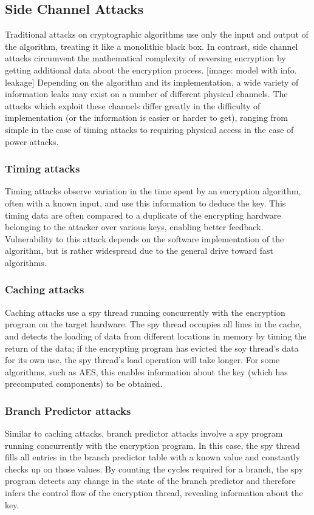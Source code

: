 \documentclass[times, 10pt,twocolumn]{article}
\begin{document}
\subsection{Side Channel Attacks}
Traditional attacks on cryptographic algorithms use only the input and output of the algorithm, treating it like a monolithic black box.  In contrast, side channel attacks circumvent the mathematical complexity of reversing encryption by getting additional data about the encryption process.  [image: model with info. leakage]  Depending on the algorithm and its implementation, a wide variety of information leaks may exist on a number of different physical channels.  The attacks which exploit these channels differ greatly in the difficulty of implementation (or the information is easier or harder to get), ranging from simple in the case of timing attacks to requiring physical access in the case of power attacks.
\subsubsection{Timing attacks}
Timing attacks observe variation in the time spent by an encryption algorithm, often with a known input, and use this information to deduce the key.  This timing data are often compared to a duplicate of the encrypting hardware belonging to the attacker over various keys, enabling better feedback.  Vulnerability to this attack depends on the software implementation of the algorithm, but is rather widespread due to the general drive toward fast algorithms.
\subsubsection{Caching attacks}
Caching attacks use a spy thread running concurrently with the encryption program on the target hardware.  The spy thread occupies all lines in the cache, and detects the loading of data from different locations in memory by timing the return of the data; if the encrypting program has evicted the soy thread's data for its own use, the spy thread's load operation will take longer.  For some algorithms, such as AES, this enables information about the key (which has precomputed components) to be obtained.
\subsubsection{Branch Predictor attacks}
Similar to caching attacks, branch predictor attacks involve a spy program running concurrently with the encryption program.  In this case, the spy thread fills all entries in the branch predictor table with a known value and constantly checks up on those values.  By counting the cycles required for a branch, the spy program detects any change in the state of the branch predictor and therefore infers the control flow of the encryption thread, revealing information about the key.
\end{document}
